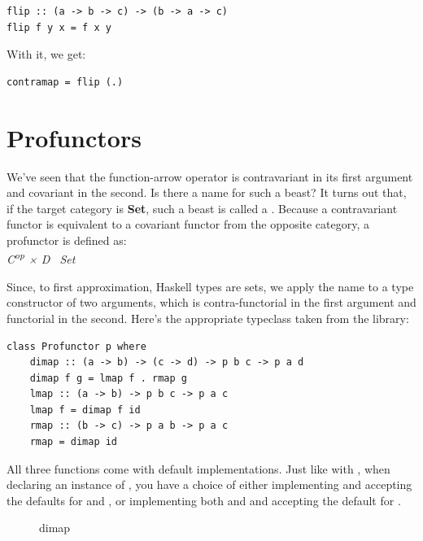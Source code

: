 \begin{Verbatim}[commandchars=\\\{\}]
flip :: (a -> b -> c) -> (b -> a -> c)
flip f y x = f x y
\end{Verbatim}
With it, we get:

\begin{Verbatim}[commandchars=\\\{\}]
contramap = flip (.)
\end{Verbatim}

\section{Profunctors}\label{profunctors}

We've seen that the function-arrow operator is contravariant in its
first argument and covariant in the second. Is there a name for such a
beast? It turns out that, if the target category is \textbf{Set}, such a
beast is called a . Because a contravariant functor is
equivalent to a covariant functor from the opposite category, a
profunctor is defined as:\\
\emph{C\textsuperscript{op} × D \to\ Set}

Since, to first approximation, Haskell types are sets, we apply the name
 to a type constructor  of two arguments,
which is contra-functorial in the first argument and functorial in the
second. Here's the appropriate typeclass taken from the
 library:

\begin{Verbatim}[commandchars=\\\{\}]
class Profunctor p where
    dimap :: (a -> b) -> (c -> d) -> p b c -> p a d
    dimap f g = lmap f . rmap g
    lmap :: (a -> b) -> p b c -> p a c
    lmap f = dimap f id
    rmap :: (b -> c) -> p a b -> p a c
    rmap = dimap id
\end{Verbatim}
All three functions come with default implementations. Just like with
, when declaring an instance of ,
you have a choice of either implementing  and accepting
the defaults for  and , or implementing both
 and  and accepting the default for
.

\begin{figure}[H]
\centering
{}
\caption{dimap}
\end{figure}

